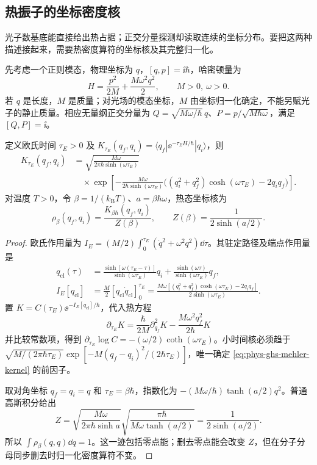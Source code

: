 \subsection{热振子的坐标密度核}
\label{sec:phys-ghs-thermal-mehler}

光子数基底能直接给出热占据；正交分量探测却读取连续的坐标分布。要把这两种描述接起来，需要热密度算符的坐标核及其完整归一化。

先考虑一个正则模态，物理坐标为 $q$，$[q,p]=\ii\hbar$，哈密顿量为
\[
H=\frac{p^2}{2M}+\frac{M\omega^2q^2}{2},\qquad M>0,\ \omega>0.
\]
若 $q$ 是长度，$M$ 是质量；对光场的模态坐标，$M$ 由坐标归一化确定，不能另赋光子的静止质量。相应无量纲正交分量为 $Q=\sqrt{M\omega/\hbar}\,q$、$P=p/\sqrt{M\hbar\omega}$，满足 $[Q,P]=\ii$。

\begin{proposition}[欧氏核及热态]
\label{prop:phys-ghs-mehler-thermal}
定义欧氏时间 $\tau_E>0$ 及 $K_{\tau_E}(q_f,q_i)=\langle q_f|\ee^{-\tau_E H/\hbar}|q_i\rangle$，则
\begin{equation}
\begin{split}
K_{\tau_E}(q_f,q_i)
&=\sqrt{\frac{M\omega}{2\pi\hbar\sinh(\omega\tau_E)}}\\
&\quad\times\exp\left[-\frac{M\omega}{2\hbar\sinh(\omega\tau_E)}
\bigl((q_i^2+q_f^2)\cosh(\omega\tau_E)-2q_iq_f\bigr)\right].
\end{split}
\label{eq:phys-ghs-mehler-kernel}
\end{equation}
对温度 $T>0$，令 $\beta=1/(k_{\mathrm B}T)$、$a=\beta\hbar\omega$，热态坐标核为
\begin{equation}
\rho_\beta(q_f,q_i)=\frac{K_{\beta\hbar}(q_f,q_i)}{Z(\beta)},
\qquad Z(\beta)=\frac1{2\sinh(a/2)}.
\label{eq:phys-ghs-thermal-density-kernel}
\end{equation}
\end{proposition}
\begin{proof}
欧氏作用量为 $I_E=(M/2)\int_0^{\tau_E}(\dot q^2+\omega^2q^2)\dd\tau$。其驻定路径及端点作用量是
\begin{align*}
q_{\mathrm{cl}}(\tau)&=
\frac{\sinh[\omega(\tau_E-\tau)]}{\sinh(\omega\tau_E)}q_i
+\frac{\sinh(\omega\tau)}{\sinh(\omega\tau_E)}q_f,\\
I_E[q_{\mathrm{cl}}]&=\frac M2[q_{\mathrm{cl}}\dot q_{\mathrm{cl}}]_0^{\tau_E}
=\frac{M\omega[(q_i^2+q_f^2)\cosh(\omega\tau_E)-2q_iq_f]}
{2\sinh(\omega\tau_E)}.
\end{align*}
置 $K=C(\tau_E)\ee^{-I_E[q_{\mathrm{cl}}]/\hbar}$，代入热方程
\[
\partial_{\tau_E}K=\frac{\hbar}{2M}\partial_{q_f}^2K
-\frac{M\omega^2q_f^2}{2\hbar}K
\]
并比较常数项，得到 $\partial_{\tau_E}\log C=-(\omega/2)\coth(\omega\tau_E)$。小时间核必须趋于 $\sqrt{M/(2\pi\hbar\tau_E)}\exp[-M(q_f-q_i)^2/(2\hbar\tau_E)]$，唯一确定 \cref{eq:phys-ghs-mehler-kernel} 的前因子。

取对角坐标 $q_f=q_i=q$ 和 $\tau_E=\beta\hbar$，指数化为 $-(M\omega/\hbar)\tanh(a/2)q^2$。普通高斯积分给出
\[
Z=\sqrt{\frac{M\omega}{2\pi\hbar\sinh a}}
\sqrt{\frac{\pi\hbar}{M\omega\tanh(a/2)}}
=\frac1{2\sinh(a/2)}.
\]
所以 $\int\rho_\beta(q,q)\dd q=1$。这一迹包括零点能；删去零点能会改变 $Z$，但在分子分母同步删去时归一化密度算符不变。
\end{proof}

